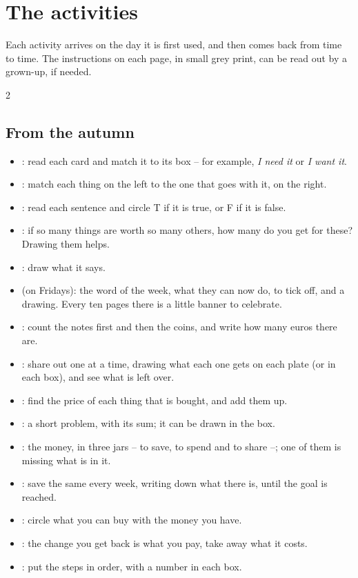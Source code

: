 \section*{The activities}

Each activity arrives on the day it is first used, and then comes back
from time to time. The instructions on each page, in small grey print,
can be read out by a grown-up, if needed.

{\small
\begin{multicols}{2}
\raggedright
\subsection*{From the autumn}
\begin{itemize}[leftmargin=5mm, itemsep=1pt, topsep=0pt]
\item \textbf{\lblClasifica}: read each card and match it to its box
  -- for example, \emph{I need it} or \emph{I want it}.
\item \textbf{\lblUne}: match each thing on the left to the one that
  goes with it, on the right.
\item \textbf{\lblVF}: read each sentence and circle T if it is true,
  or F if it is false.
\item \textbf{\lblTrueque}: if so many things are worth so many others,
  how many do you get for these? Drawing them helps.
\item \textbf{\lblDibuja}: draw what it says.
\item \textbf{\lblRepasa} (on Fridays): the word of the week, what they
  can now do, to tick off, and a drawing. Every ten pages there is a
  little banner to celebrate.
\item \textbf{\lblDinero}: count the notes first and then the coins,
  and write how many euros there are.
\item \textbf{\lblReparte}: share out one at a time, drawing what each
  one gets on each plate (or in each box), and see what is left over.
\item \textbf{\lblCompra}: find the price of each thing that is bought,
  and add them up.
\item \textbf{\lblProblema}: a short problem, with its sum; it can be
  drawn in the box.
\item \textbf{\lblBotes}: the money, in three jars -- to save, to spend
  and to share --; one of them is missing what is in it.
\item \textbf{\lblHucha}: save the same every week, writing down what
  there is, until the goal is reached.
\item \textbf{\lblLlega}: circle what you can buy with the money you
  have.
\item \textbf{\lblVuelta}: the change you get back is what you pay,
  take away what it costs.
\item \textbf{\lblOrdena}: put the steps in order, with a number in
  each box.
\end{itemize}

\end{multicols}}
